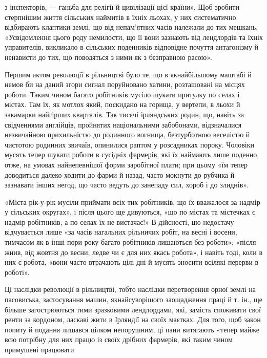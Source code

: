 \parcont{}  %
з інспекторів, — ганьба для релігії й цивілізації цієї країни».
Щоб зробити стерпнішим життя сільських наймитів в їхніх льохах,
у них систематично відбирають клаптики землі, що від непам’ятних
часів належали до тих мешкань. «Усвідомлення цього
роду немилости, що її вони зазнають від лендлордів та їхніх управителів,
викликало в сільських поденників відповідне почуття
антагонізму й ненависти до тих, що поводяться з ними як з безправною
расою».

Першим актом революції в рільництві було те, що в якнайбільшому
маштабі й немов би на даний згори сиґнал поруйновано
хатини, розташовані на місцях роботи. Таким чином багато робітників
мусіло шукати притулку по селах і містах. Там їх, як
мотлох який, поскидано на горища, у вертепи, в льохи й закамарки
найгірших кварталів. Так тисячі ірляндських родин, що,
навіть за свідченнями англійців, пройнятих національними забобонами,
відзначалися незвичайною прихильністю до родинного
вогнища, безтурботною веселістю й чистотою родинних звичаїв,
опинилися раптом у розсадниках пороку. Чоловіки мусять тепер
шукати роботи в сусідніх фармерів, які їх наймають лише поденно,
отже, на умовах найнепевнішої форми заробітної плати;
при цьому «їм тепер доводиться далеко ходити до фарми й назад,
часто мокнути до рубчика й зазнавати інших негод, що часто
ведуть до занепаду сил, хороб і до злиднів».

«Міста рік-у-рік мусіли приймати всіх тих робітників, що
їх вважалося за надмір у сільських округах», і після цього
ще дивуються, «що по містах та містечках є надмір робітників,
а по селах їх не вистачає!» В дійсності, цю недостачу відчувається
лише «за часів нагальних рільничих робіт, на весні
і восени, тимчасом як в інші пори року багато робітників лишаються
без роботи»; «після жнив, від жовтня до весни, ледве
чи є для них якась робота», і навіть тоді, коли в них є робота,
«вони часто втрачають цілі дні й мусять зносити всілякі
перерви в роботі».

Ці наслідки революції в рільництві, тобто наслідки перетворення
орної землі на пасовиська, застосування машин, якнайсуворішого
заощадження праці й т. ін., ще більше загострюються
тими зразковими лендлордами, які, замість споживати свої ренти
за кордоном, ласкаві жити в Ірляндії на своїх маєтках. Для того,
щоб закон попиту й подання лишався цілком непорушним, ці
пани витягають «тепер майже всю потрібну для них працю із
своїх дрібних фармерів, які таким чином примушені працювати
\parbreak{}  %
